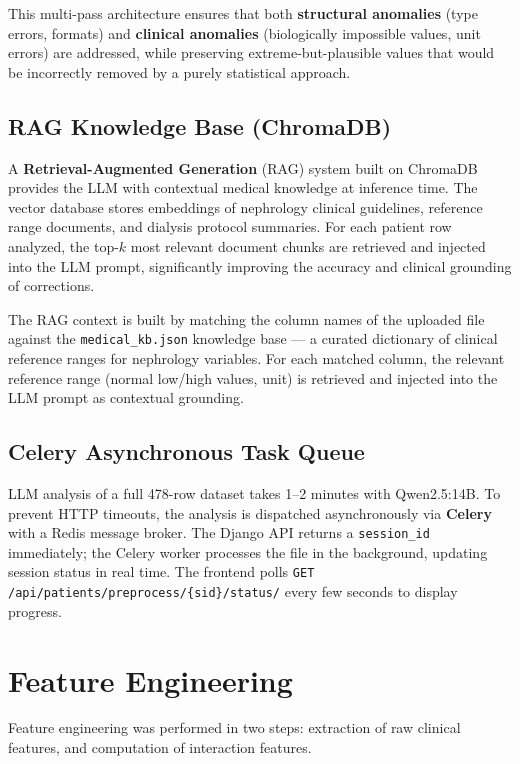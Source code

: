 \documentclass[12pt,a4paper,twoside]{report}
\begin{document}
This multi-pass architecture ensures that both \textbf{structural anomalies} (type errors, formats) and \textbf{clinical anomalies} (biologically impossible values, unit errors) are addressed, while preserving extreme-but-plausible values that would be incorrectly removed by a purely statistical approach.

\subsection{RAG Knowledge Base (ChromaDB)}

A \textbf{Retrieval-Augmented Generation} (RAG) \cite{rag_lewis_2020} system built on ChromaDB provides the LLM with contextual medical knowledge at inference time. The vector database stores embeddings of nephrology clinical guidelines, reference range documents, and dialysis protocol summaries. For each patient row analyzed, the top-$k$ most relevant document chunks are retrieved and injected into the LLM prompt, significantly improving the accuracy and clinical grounding of corrections.

The RAG context is built by matching the column names of the uploaded file against the \texttt{medical\_kb.json} knowledge base — a curated dictionary of clinical reference ranges for nephrology variables. For each matched column, the relevant reference range (normal low/high values, unit) is retrieved and injected into the LLM prompt as contextual grounding.

\subsection{Celery Asynchronous Task Queue}

LLM analysis of a full 478-row dataset takes 1--2 minutes with Qwen2.5:14B. To prevent HTTP timeouts, the analysis is dispatched asynchronously via \textbf{Celery} with a Redis message broker. The Django API returns a \texttt{session\_id} immediately; the Celery worker processes the file in the background, updating session status in real time. The frontend polls \texttt{GET /api/patients/preprocess/\{sid\}/status/} every few seconds to display progress.


\section{Feature Engineering}
\label{sec:feature_engineering}

Feature engineering was performed in two steps: extraction of raw clinical features, and computation of interaction features.
\end{document}
